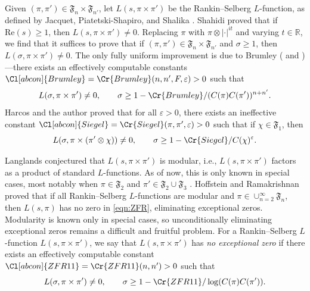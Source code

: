 \documentclass[11pt]{amsart}
\theoremstyle{remark}
\numberwithin{equation}{section}
\begin{document}
Given $(\pi,\pi')\in\mathfrak{F}_{n}\times\mathfrak{F}_{n'}$, let $L(s,\pi\times\pi')$ be the Rankin--Selberg $L$-function, as defined by Jacquet, Piatetski-Shapiro, and Shalika \cite{JPSS}.  Shahidi \cite{Shahidi} proved that if $\mathrm{Re}(s)\geq 1$, then $L(s,\pi\times\pi')\neq 0$.  Replacing $\pi$ with $\pi\otimes|\cdot|^{it}$ and varying $t\in\mathbb{R}$, we find that it suffices to prove that if $(\pi,\pi')\in\mathfrak{F}_{n}\times\mathfrak{F}_{n'}$ and $\sigma\geq 1$, then $L(\sigma,\pi\times\pi')\neq 0$.  The only fully uniform improvement is due to Brumley (\cite{Brumley} and \cite[Appendix]{Lapid})---there exists an effectively computable constants $\Cl[abcon]{Brumley}=\Cr{Brumley}(n,n',F,\varepsilon)>0$ such that
\[
L(\sigma,\pi\times\pi')\neq 0,\qquad \sigma\geq 1-\Cr{Brumley}/(C(\pi)C(\pi'))^{n+n'}.
\]
Harcos and the author \cite[Theorem 1.1]{HarcosThorner} proved that for all $\varepsilon>0$, there exists an ineffective constant $\Cl[abcon]{Siegel}=\Cr{Siegel}(\pi,\pi',\varepsilon)>0$ such that if $\chi\in\mathfrak{F}_{1}$, then
\[
L(\sigma,\pi\times(\pi'\otimes\chi))\neq 0,\qquad \sigma\geq 1-\Cr{Siegel}/C(\chi)^{\varepsilon}.
\]

Langlands conjectured that $L(s,\pi\times\pi')$ is modular, i.e., $L(s,\pi\times\pi')$ factors as a product of standard $L$-functions.  As of now, this is only known in special cases, most notably when $\pi\in\mathfrak{F}_{2}$ and $\pi'\in\mathfrak{F}_{2}\cup\mathfrak{F}_{3}$ \cite{KimShahidi,RamakrishnanWang}.  Hoffstein and Ramakrishnan \cite{HoffsteinRamakrishnan} proved that if all Rankin--Selberg $L$-functions are modular and $\pi \in \cup_{n=2}^{\infty}\mathfrak{F}_{n}$, then $L(s,\pi)$ has no zero in \eqref{eqn:ZFR}, eliminating exceptional zeros.  Modularity is known only in special cases, so unconditionally eliminating exceptional zeros remains a difficult and fruitful problem.  For a Rankin--Selberg $L$-function $L(s,\pi\times\pi')$, we say that $L(s,\pi\times\pi')$ has {\it no exceptional zero} if there exists an effectively computable constant $\Cl[abcon]{ZFR11}=\Cr{ZFR11}(n,n')>0$ such that
\[
L(\sigma,\pi\times\pi')\neq 0,\qquad \sigma \geq 1-\Cr{ZFR11}/\log(C(\pi)C(\pi')).
\]
\end{document}
